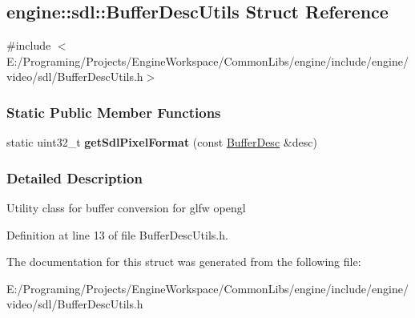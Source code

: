 \hypertarget{a00009}{}\subsection{engine\+:\+:sdl\+:\+:Buffer\+Desc\+Utils Struct Reference}
\label{a00009}


{\ttfamily \#include $<$E\+:/\+Programing/\+Projects/\+Engine\+Workspace/\+Common\+Libs/engine/include/engine/video/sdl/\+Buffer\+Desc\+Utils.\+h$>$}

\subsubsection*{Static Public Member Functions}
\begin{DoxyCompactItemize}
\item 
static uint32\+\_\+t {\bfseries get\+Sdl\+Pixel\+Format} (const \hyperlink{a00007}{Buffer\+Desc} \&desc)\hypertarget{a00009_afc957593ac58718dc9156adb90db36ed}{}\label{a00009_afc957593ac58718dc9156adb90db36ed}

\end{DoxyCompactItemize}


\subsubsection{Detailed Description}
Utility class for buffer conversion for glfw opengl 

Definition at line 13 of file Buffer\+Desc\+Utils.\+h.



The documentation for this struct was generated from the following file\+:\begin{DoxyCompactItemize}
\item 
E\+:/\+Programing/\+Projects/\+Engine\+Workspace/\+Common\+Libs/engine/include/engine/video/sdl/Buffer\+Desc\+Utils.\+h\end{DoxyCompactItemize}
